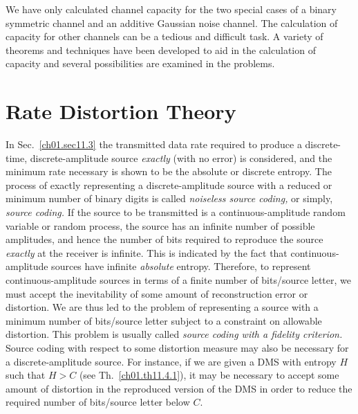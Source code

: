 We have only calculated channel capacity for the two special cases of a
binary symmetric channel and an additive Gaussian noise channel. The
calculation
of capacity for other channels can be a tedious and difficult task. A
variety of theorems and techniques have been developed to aid in
the calculation
of capacity and several possibilities are examined in the problems.



\section{Rate Distortion Theory}
\label{ch01.sec11.5}


In Sec.~\ref{ch01.sec11.3} the transmitted data rate required to produce
a discrete-time, discrete-amplitude source \textit{exactly} (with no error)
is considered, and the minimum rate necessary is shown to be the absolute
or discrete entropy.
The process of exactly representing a discrete-amplitude
source with a reduced or minimum number of binary digits is called
\textit{noiseless source coding,} or simply, \textit{source coding.}
If the source to be transmitted is a continuous-amplitude random variable
or random process, the source has an infinite number of possible amplitudes,
and hence the number of bits required to reproduce the source
\textit{exactly} at the receiver is infinite.
This is indicated by the fact that continuous-amplitude sources have
infinite \textit{absolute} entropy.
Therefore, to represent continuous-amplitude sources in terms of a
finite number of bits/source letter, we must accept the inevitability
of some amount of reconstruction error or distortion.
We are thus led to the problem of representing a source with a
minimum number of bits/source letter subject to a constraint on
allowable distortion.
This problem is usually called
\textit{source coding with a fidelity criterion.}
Source coding with respect to some distortion measure may also be
necessary for a discrete-amplitude source.
For instance, if we are given a DMS with entropy $H$ such that
$H > C$ (see Th.~\ref{ch01.th11.4.1}), it may be necessary to
accept some amount of distortion in the reproduced version of
the DMS in order to reduce the required number of bits/source
letter below $C$.


